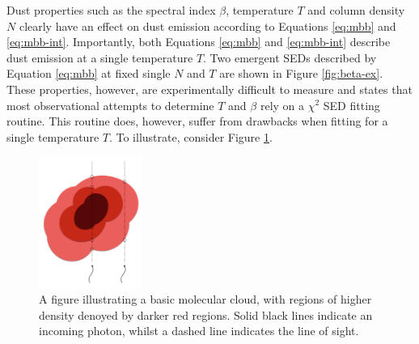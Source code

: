\documentclass{report}
\begin{document}
Dust properties such as the spectral index $\beta$, temperature $T$ and column density $N$ clearly have an effect on dust emission according to Equations \ref{eq:mbb} and \ref{eq:mbb-int}. Importantly, both Equations \ref{eq:mbb} and \ref{eq:mbb-int} describe dust emission at a single temperature $T$. Two emergent SEDs described by Equation \ref{eq:mbb} at fixed single $N$ and $T$ are shown in Figure \ref{fig:beta-ex}. These properties, however, are experimentally difficult to measure and
\textcite{kelly} states that most observational attempts to determine $T$ and $\beta$ rely on a $\chi^{2}$ SED fitting routine. This routine does, however, suffer from drawbacks when fitting for a single temperature $T$. To illustrate, consider Figure \ref{fig:col}.

\begin{figure}[h]
  \begin{center}
    \includegraphics[width=0.3\textwidth]{../img/column.png}
    \caption[A figure illustrating a basic molecular cloud, with regions of higher density denoted by darker red regions. Solid black lines indicate an incoming photon, whilst a dashed line indicates the line of sight.]{A figure illustrating a basic molecular cloud, with regions of higher density denoyed by darker red regions. Solid black lines indicate an incoming photon, whilst a dashed line indicates the line of sight.}
  \end{center}\label{fig:col}
\end{figure}
\end{document}
